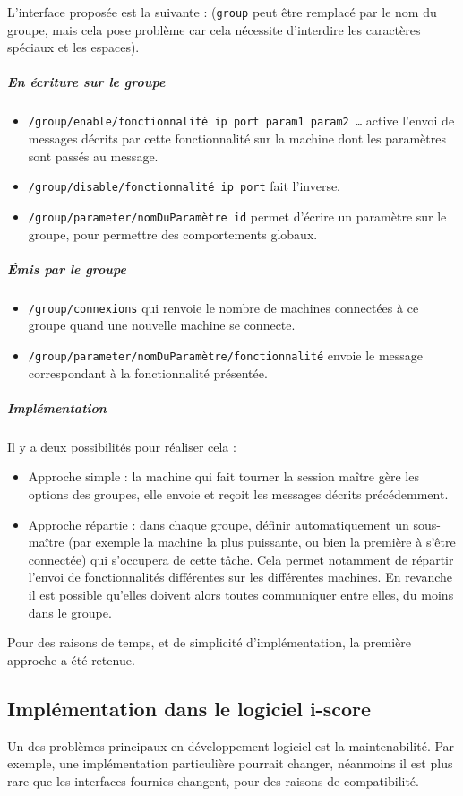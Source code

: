 L'interface proposée est la suivante : (\texttt{group} peut être remplacé par le nom du groupe, mais cela pose problème car cela nécessite d'interdire les caractères spéciaux et les espaces).

\subparagraph{En écriture sur le groupe} 
\begin{itemize}
	\item \texttt{/group/enable/fonctionnalité ip port param1 param2 \dots} active l'envoi de messages décrits par cette fonctionnalité sur la machine dont les paramètres sont passés au message.
	\item \texttt{/group/disable/fonctionnalité ip port} fait l'inverse.
	\item \texttt{/group/parameter/nomDuParamètre id} permet d'écrire un paramètre sur le groupe, pour permettre des comportements globaux.
\end{itemize}

\subparagraph{Émis par le groupe}
\begin{itemize}
	\item \texttt{/group/connexions} qui renvoie le nombre de machines connectées à ce groupe quand une nouvelle machine se connecte.
	\item \texttt{/group/parameter/nomDuParamètre/fonctionnalité} envoie le message correspondant à la fonctionnalité présentée.
\end{itemize}

\subparagraph{Implémentation}
Il y a deux possibilités pour réaliser cela : 
\begin{itemize}
	\item Approche simple : la machine qui fait tourner la session maître gère les options des groupes, elle envoie et reçoit les messages décrits précédemment.
	\item Approche répartie : dans chaque groupe, définir automatiquement un sous-maître (par exemple la machine la plus puissante, ou bien la première à s'être connectée) qui s'occupera de cette tâche. Cela permet notamment de répartir l'envoi de fonctionnalités différentes sur les différentes machines. En revanche il est possible qu'elles doivent alors toutes communiquer entre elles, du moins dans le groupe.
\end{itemize}

Pour des raisons de temps, et de simplicité d'implémentation, la première approche a été retenue.

\subsection{Implémentation dans le logiciel i-score}
Un des problèmes principaux en développement logiciel est la maintenabilité. Par exemple, une implémentation particulière pourrait changer, néanmoins il est plus rare que les interfaces fournies changent, pour des raisons de compatibilité.

